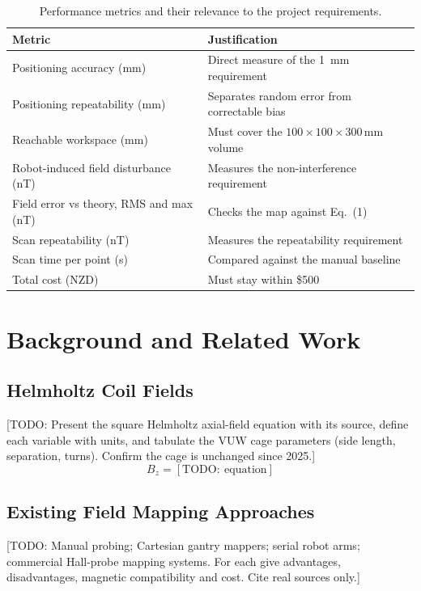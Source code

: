 \documentclass[conference]{IEEEtran}
\begin{document}
\begin{table}[t]
\caption{Performance metrics and their relevance to the project requirements.}
\label{tab:metrics}
\centering\small
\begin{tabular}{p{}p{}}
\toprule
Metric & Justification \\
\midrule
Positioning accuracy (mm) & Direct measure of the \SI{1}{mm} requirement \\
Positioning repeatability (mm) & Separates random error from correctable bias \\
Reachable workspace (mm) & Must cover the $100\times100\times300$\,mm volume \\
Robot-induced field disturbance (nT) & Measures the non-interference requirement \\
Field error vs theory, RMS and max (nT) & Checks the map against Eq.~(1) \\
Scan repeatability (nT) & Measures the repeatability requirement \\
Scan time per point (s) & Compared against the manual baseline \\
Total cost (NZD) & Must stay within \$500 \\
\bottomrule
\end{tabular}
\end{table}

\section{Background and Related Work}
\subsection{Helmholtz Coil Fields}
[TODO: Present the square Helmholtz axial-field equation with its source, define each
variable with units, and tabulate the VUW cage parameters (side length, separation,
turns). Confirm the cage is unchanged since 2025.]
\begin{equation}
B_z = [\mathrm{TODO:\ equation}]
\end{equation}

\subsection{Existing Field Mapping Approaches}
[TODO: Manual probing; Cartesian gantry mappers; serial robot arms; commercial
Hall-probe mapping systems. For each give advantages, disadvantages, magnetic
compatibility and cost. Cite real sources only.]
\end{document}
